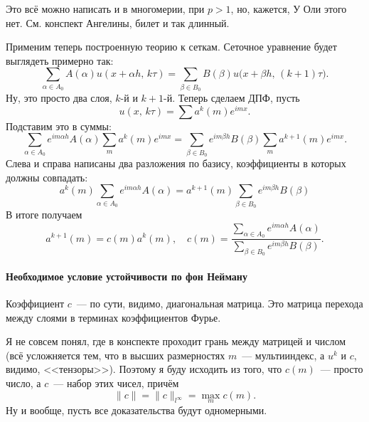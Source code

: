 \documentclass{trlnotes}
\begin{document}
    Это всё можно написать и в многомерии, при $p>1$, но, кажется, У Оли этого нет. См. конспект Ангелины, билет и так длинный.

    Применим теперь построенную теорию к сеткам. Сеточное уравнение будет выглядеть примерно так:
    \[
        \sum\limits_{\alpha \in A_0} A(\alpha) u(x + \alpha h, \, k \tau) = \sum\limits_{\beta \in B_0} B(\beta) u\big(x + \beta h, \, (k+1) \tau\big).
    \]
    Ну, это просто два слоя, $k$-й и $k+1$-й. Теперь сделаем ДПФ, пусть
    \[
        u(x, \, k\tau) = \sum a^k(m) e^{imx}.
    \]
    Подставим это в суммы:
    \[
        \sum\limits_{\alpha \in A_0} e^{im\alpha h} A(\alpha) \sum\limits_m a^k(m) e^{imx} = \sum\limits_{\beta \in B_0} e^{im\beta h} B(\beta) \sum\limits_m a^{k+1}(m) e^{imx}.
    \]
    Слева и справа написаны два разложения по базису, коэффициенты в которых должны совпадать:
    \[
        a^k(m) \sum\limits_{\alpha \in A_0} e^{im\alpha h} A(\alpha)  = a^{k+1}(m) \sum\limits_{\beta \in B_0} e^{im\beta h} B(\beta) 
    \]
    В итоге получаем
    \[
        a^{k + 1}(m) = c(m) a^k(m), \quad c(m) = \dfrac{\sum\limits_{\alpha \in A_0} e^{im\alpha h} A(\alpha)}{\sum\limits_{\beta \in B_0} e^{im\beta h} B(\beta)}.
    \]

    \paragraph{Необходимое условие устойчивости по фон Нейману}\label{par:neumann}

    \begin{rem} 
        Коэффициент $c$~--- по сути, видимо, диагональная матрица. Это матрица перехода между слоями в терминах коэффициентов Фурье. 

        Я не совсем понял, где в конспекте проходит грань между матрицей и числом (всё усложняется тем, что в высших размерностях $m$~--- мультииндекс, а $u^k$ и $c$, видимо, <<тензоры>>). Поэтому я буду исходить из того, что $c(m)$~--- просто число, а $c$~--- набор этих чисел, причём
        \[  
            \|c\| = \|c\|_{l^{\infty}} = \max\limits_m c(m).
        \]
        Ну и вообще, пусть все доказательства будут одномерными.
    \end{rem}
\end{document}
